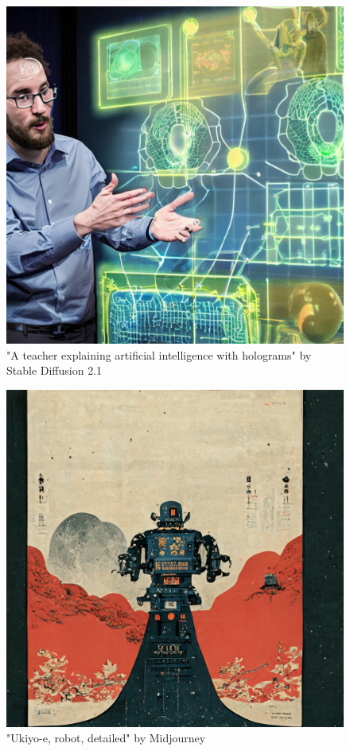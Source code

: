 \documentclass[conference]{IEEEtran}
\begin{document}
\begin{figure}[htbp]
\centerline{\includegraphics[scale=.4]{img/stablediffusion.jpg}}
\caption{"A teacher explaining artificial intelligence with holograms" by Stable Diffusion 2.1}
\label{ldmimage}
\end{figure}
\begin{figure}[htbp]
\centerline{\includegraphics[scale=.09]{img/midjourney/fexed_ukiyo-e_robot_detailed_449ecbde-e204-4e21-8542-9c40ef906080.png}}
\caption{"Ukiyo-e, robot, detailed" by Midjourney}
\label{midjourneyimage}
\end{figure}
\end{document}
